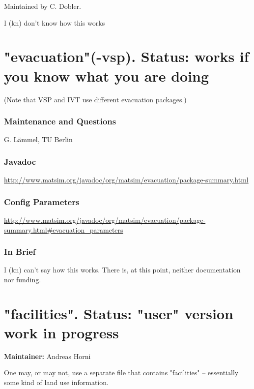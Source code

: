Maintained by C. Dobler.

I (kn) don't know how this works

\vfill\eject
\section{"evacuation"(-vsp). Status: works if you know what you are doing}

(Note that VSP and IVT use different evacuation packages.)

\subsubsection{\textbf{Maintenance and Questions}}

G. Lämmel, TU Berlin

\subsubsection{\textbf{Javadoc}}

\href{http://www.matsim.org/javadoc/org/matsim/evacuation/package-summary.html}{http://www.matsim.org/javadoc/org/matsim/evacuation/package-summary.html}


\subsubsection{\textbf{\textbf{Config Parameters{}}}}

\href{http://www.matsim.org/javadoc/org/matsim/evacuation/package-summary.html#evacuation_parameters}{http://www.matsim.org/javadoc/org/matsim/evacuation/package-summary.html\#evacuation\_parameters}

\subsubsection{\textbf{\textbf{In Brief}}}

I (kn) can't say how this works. There is, at this point, neither documentation nor funding.

\vfill\eject
\section{"facilities". Status: "user" version work in progress}

\textbf{Maintainer:} Andreas Horni

One may, or may not, use a separate file that contains "facilities" – essentially some kind of land use information.

